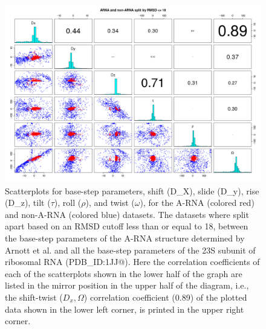 \begin{figure}
 \centering
\includegraphics[angle=90, scale=0.48]{Chapter2/warna_step.png}
\caption{Scatterplots for  base-step parameters, shift  (D_{X}), slide
(D_{y}),  rise  (D_{z}),  tilt  ($\tau$),  roll  ($\rho$),  and  twist
($\omega$), for  the A-RNA (colored red) and  non-A-RNA (colored blue)
datasets. The datasets where split  apart based on an RMSD cutoff less
than or  equal to  18, between the  base-step parameters of  the A-RNA
structure determined  by Arnott et  al. \cite{arnott1973} and  all the
base-step   parameters   of  the   23S   subunit   of  ribosomal   RNA
(PDB\_ID:1JJ@).  Here  the correlation  coefficients  of  each of  the
scatterplots shown  in the lower half  of the graph are  listed in the
mirror  position  in  the  upper   half  of  the  diagram,  i.e.,  the
shift-twist  ($D_{x}, \Omega$) correlation  coefficient (0.89)  of the
plotted data shown  in the lower left corner, is  printed in the upper
right corner.}
\label{fig:allsteps}
\end{figure}

